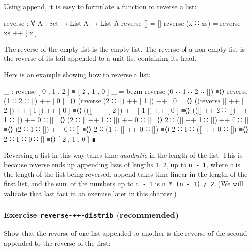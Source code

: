Using append, it is easy to formulate a function to reverse a list:

\begin{fence}
\begin{code}
reverse : ∀ {A : Set} → List A → List A
reverse []        =  []
reverse (x ∷ xs)  =  reverse xs ++ [ x ]
\end{code}
\end{fence}

The reverse of the empty list is the empty list. The reverse of a
non-empty list is the reverse of its tail appended to a unit list
containing its head.

Here is an example showing how to reverse a list:

\begin{fence}
\begin{code}
_ : reverse [ 0 , 1 , 2 ] ≡ [ 2 , 1 , 0 ]
_ =
  begin
    reverse (0 ∷ 1 ∷ 2 ∷ [])
  ≡⟨⟩
    reverse (1 ∷ 2 ∷ []) ++ [ 0 ]
  ≡⟨⟩
    (reverse (2 ∷ []) ++ [ 1 ]) ++ [ 0 ]
  ≡⟨⟩
    ((reverse [] ++ [ 2 ]) ++ [ 1 ]) ++ [ 0 ]
  ≡⟨⟩
    (([] ++ [ 2 ]) ++ [ 1 ]) ++ [ 0 ]
  ≡⟨⟩
    (([] ++ 2 ∷ []) ++ 1 ∷ []) ++ 0 ∷ []
  ≡⟨⟩
    (2 ∷ [] ++ 1 ∷ []) ++ 0 ∷ []
  ≡⟨⟩
    2 ∷ ([] ++ 1 ∷ []) ++ 0 ∷ []
  ≡⟨⟩
    (2 ∷ 1 ∷ []) ++ 0 ∷ []
  ≡⟨⟩
    2 ∷ (1 ∷ [] ++ 0 ∷ [])
  ≡⟨⟩
    2 ∷ 1 ∷ ([] ++ 0 ∷ [])
  ≡⟨⟩
    2 ∷ 1 ∷ 0 ∷ []
  ≡⟨⟩
    [ 2 , 1 , 0 ]
  ∎
\end{code}
\end{fence}

Reversing a list in this way takes time \emph{quadratic} in the length
of the list. This is because reverse ends up appending lists of lengths
\texttt{1}, \texttt{2}, up to \texttt{n\ -\ 1}, where \texttt{n} is the
length of the list being reversed, append takes time linear in the
length of the first list, and the sum of the numbers up to
\texttt{n\ -\ 1} is \texttt{n\ *\ (n\ -\ 1)\ /\ 2}. (We will validate
that last fact in an exercise later in this chapter.)

\hypertarget{exercise-reverse--distrib-recommended}{%
\subsubsection{\texorpdfstring{Exercise \texttt{reverse-++-distrib}
(recommended)}{Exercise reverse-++-distrib (recommended)}}\label{exercise-reverse--distrib-recommended}}

Show that the reverse of one list appended to another is the reverse of
the second appended to the reverse of the first:

